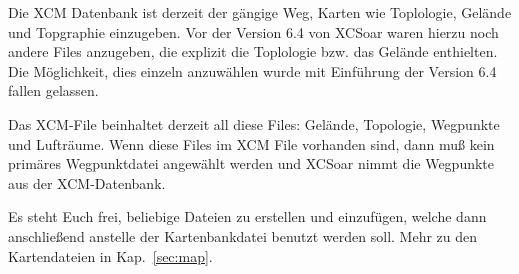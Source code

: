 Die XCM Datenbank ist derzeit der gängige Weg,
Karten wie Toplologie, Gelände und Topgraphie einzugeben. Vor der Version 6.4 von \textsf{XCSoar} waren  hierzu noch
andere Files anzugeben, die explizit die Toplologie bzw. das Gelände enthielten.
Die Möglichkeit, dies einzeln anzuwählen wurde mit Einführung der Version 6.4 fallen gelassen.

Das XCM-File beinhaltet derzeit all diese Files: Gelände, Topologie, Wegpunkte und Lufträume.
Wenn diese Files im XCM File vorhanden sind, dann muß kein primäres Wegpunktdatei
angewählt werden und \textsf{XCSoar} nimmt die Wegpunkte aus der XCM-Datenbank.

Es steht Euch frei, beliebige Dateien zu erstellen und einzufügen, welche dann anschließend
anstelle der Kartenbankdatei benutzt werden soll. Mehr zu den Kartendateien in Kap.~\ref{sec:map}.
